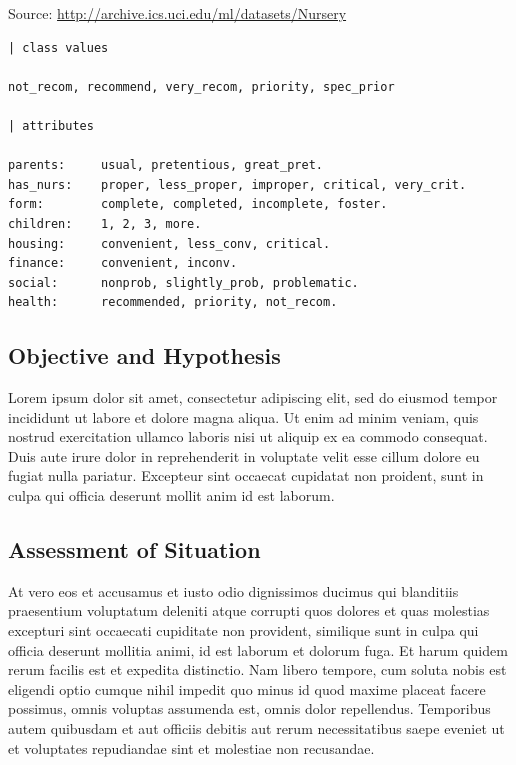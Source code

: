 Source: \url{http://archive.ics.uci.edu/ml/datasets/Nursery}

\begin{verbatim}
| class values

not_recom, recommend, very_recom, priority, spec_prior

| attributes

parents:     usual, pretentious, great_pret.
has_nurs:    proper, less_proper, improper, critical, very_crit.
form:        complete, completed, incomplete, foster.
children:    1, 2, 3, more.
housing:     convenient, less_conv, critical.
finance:     convenient, inconv.
social:      nonprob, slightly_prob, problematic.
health:      recommended, priority, not_recom.
\end{verbatim}

\hypertarget{objective-and-hypothesis}{%
\subsection{Objective and Hypothesis}\label{objective-and-hypothesis}}

Lorem ipsum dolor sit amet, consectetur adipiscing elit, sed do eiusmod
tempor incididunt ut labore et dolore magna aliqua. Ut enim ad minim
veniam, quis nostrud exercitation ullamco laboris nisi ut aliquip ex ea
commodo consequat. Duis aute irure dolor in reprehenderit in voluptate
velit esse cillum dolore eu fugiat nulla pariatur. Excepteur sint
occaecat cupidatat non proident, sunt in culpa qui officia deserunt
mollit anim id est laborum.

\hypertarget{assessment-of-situation}{%
\subsection{Assessment of Situation}\label{assessment-of-situation}}

At vero eos et accusamus et iusto odio dignissimos ducimus qui
blanditiis praesentium voluptatum deleniti atque corrupti quos dolores
et quas molestias excepturi sint occaecati cupiditate non provident,
similique sunt in culpa qui officia deserunt mollitia animi, id est
laborum et dolorum fuga. Et harum quidem rerum facilis est et expedita
distinctio. Nam libero tempore, cum soluta nobis est eligendi optio
cumque nihil impedit quo minus id quod maxime placeat facere possimus,
omnis voluptas assumenda est, omnis dolor repellendus. Temporibus autem
quibusdam et aut officiis debitis aut rerum necessitatibus saepe eveniet
ut et voluptates repudiandae sint et molestiae non recusandae.

